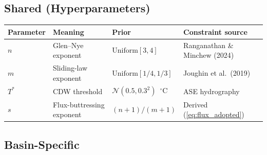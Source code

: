 \documentclass[11pt]{article}
\theoremstyle{definition}
\begin{document}
\subsection{Shared (Hyperparameters)}

\begin{center}
\begin{tabular}{llll}
  \toprule
  \textbf{Parameter} & \textbf{Meaning} & \textbf{Prior} & \textbf{Constraint source} \\
  \midrule
  $n$ & Glen--Nye exponent & $\text{Uniform}[3, 4]$ & Ranganathan \& Minchew (2024) \\
  $m$ & Sliding-law exponent & $\text{Uniform}[1/4, 1/3]$ & Joughin et al.\ (2019) \\
  $T^{*}$ & CDW threshold & $\mathcal{N}(0.5, 0.3^2)$~${}^\circ$C & ASE hydrography \\
  $s$ & Flux-buttressing exponent & $(n+1)/(m+1)$ & Derived (\cref{eq:flux_adopted}) \\
  \bottomrule
\end{tabular}
\end{center}

\subsection{Basin-Specific}
\end{document}
